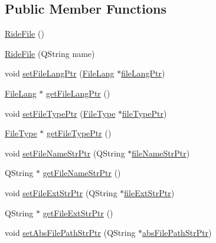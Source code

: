 \subsection*{Public Member Functions}
\begin{DoxyCompactItemize}
\item 
\hyperlink{class_ride_file_af30fdd3c7aedf2aaea0a30932920892f}{Ride\-File} ()
\item 
\hyperlink{class_ride_file_aef075f3d70437cecad61ab37c84bce25}{Ride\-File} (Q\-String name)
\item 
void \hyperlink{class_ride_file_a38fd4f68163a40da2d17f0e3e9856c2a}{set\-File\-Lang\-Ptr} (\hyperlink{class_ride_file_af2f1eb81fe20b91d4d3b8d96e457380a}{File\-Lang} $\ast$\hyperlink{class_ride_file_acbfd3155fd50ad8fa0711ae3e452f372}{file\-Lang\-Ptr})
\item 
\hyperlink{class_ride_file_af2f1eb81fe20b91d4d3b8d96e457380a}{File\-Lang} $\ast$ \hyperlink{class_ride_file_a4e084f2d75c7dc37a006d1ecb1a8b062}{get\-File\-Lang\-Ptr} ()
\item 
void \hyperlink{class_ride_file_ac46e97265d600fb7b5e48afc3b1088c4}{set\-File\-Type\-Ptr} (\hyperlink{class_ride_file_af8610cfd653a22e79b91ed2f675fc9d5}{File\-Type} $\ast$\hyperlink{class_ride_file_acdbc170d7f02d66dffb8b715609735c2}{file\-Type\-Ptr})
\item 
\hyperlink{class_ride_file_af8610cfd653a22e79b91ed2f675fc9d5}{File\-Type} $\ast$ \hyperlink{class_ride_file_aed8d1d3724082edfc88a24e8c09c2c0e}{get\-File\-Type\-Ptr} ()
\item 
void \hyperlink{class_ride_file_af1c175435c054697297961084432e207}{set\-File\-Name\-Str\-Ptr} (Q\-String $\ast$\hyperlink{class_ride_file_a6eeba18da5e7d5e7b3afde7c65bd1f7a}{file\-Name\-Str\-Ptr})
\item 
Q\-String $\ast$ \hyperlink{class_ride_file_a6c99d7b87c42080d74c421344bd2eab7}{get\-File\-Name\-Str\-Ptr} ()
\item 
void \hyperlink{class_ride_file_a5ebdf834588a85658a4aa62928084039}{set\-File\-Ext\-Str\-Ptr} (Q\-String $\ast$\hyperlink{class_ride_file_a29d334700d1480159fc69b59f7dc02a8}{file\-Ext\-Str\-Ptr})
\item 
Q\-String $\ast$ \hyperlink{class_ride_file_aeeee36fe1bf86f2c26cb03e229a145e8}{get\-File\-Ext\-Str\-Ptr} ()
\item 
void \hyperlink{class_ride_file_a3da2b505866ffc9562fcfaea4991d8d6}{set\-Abs\-File\-Path\-Str\-Ptr} (Q\-String $\ast$\hyperlink{class_ride_file_a48f3da6d11df5097b65290213c050a28}{abs\-File\-Path\-Str\-Ptr})
\item 

\end{DoxyCompactItemize}
